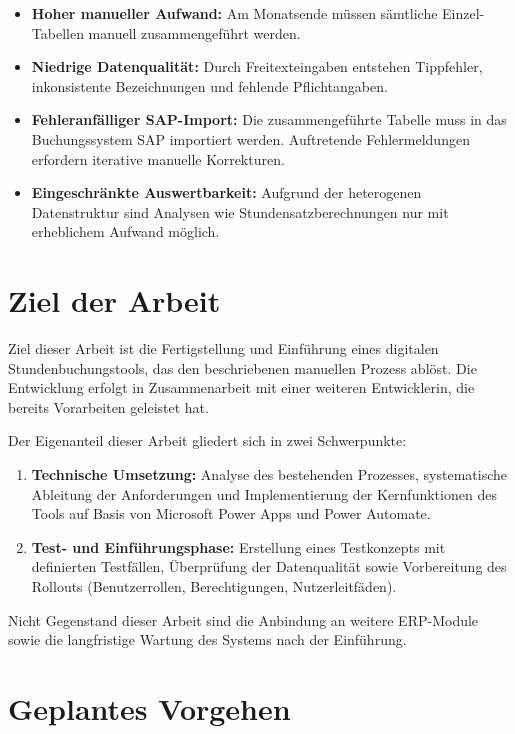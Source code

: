 \begin{itemize}
    \item \textbf{Hoher manueller Aufwand:} Am Monatsende müssen 
    sämtliche Einzel-Tabellen manuell zusammengeführt werden.
    \item \textbf{Niedrige Datenqualität:} Durch Freitexteingaben 
    entstehen Tippfehler, inkonsistente Bezeichnungen und fehlende 
    Pflichtangaben.
    \item \textbf{Fehleranfälliger SAP-Import:} Die zusammengeführte 
    Tabelle muss in das Buchungssystem SAP importiert werden. 
    Auftretende Fehlermeldungen erfordern iterative manuelle 
    Korrekturen.
    \item \textbf{Eingeschränkte Auswertbarkeit:} Aufgrund der 
    heterogenen Datenstruktur sind Analysen wie 
    Stundensatzberechnungen nur mit erheblichem Aufwand möglich.
\end{itemize}

\section{Ziel der Arbeit}
\label{sec:ziel}

Ziel dieser Arbeit ist die Fertigstellung und Einführung eines 
digitalen Stundenbuchungstools, das den beschriebenen manuellen 
Prozess ablöst. Die Entwicklung erfolgt in Zusammenarbeit mit einer 
weiteren Entwicklerin, die bereits Vorarbeiten geleistet hat.

Der Eigenanteil dieser Arbeit gliedert sich in zwei Schwerpunkte:

\begin{enumerate}
    \item \textbf{Technische Umsetzung:} Analyse des bestehenden 
    Prozesses, systematische Ableitung der Anforderungen und 
    Implementierung der Kernfunktionen des Tools auf Basis von 
    Microsoft Power Apps und Power Automate.
    \item \textbf{Test- und Einführungsphase:} Erstellung eines 
    Testkonzepts mit definierten Testfällen, Überprüfung der 
    Datenqualität sowie Vorbereitung des Rollouts (Benutzerrollen, 
    Berechtigungen, Nutzerleitfäden).
\end{enumerate}

Nicht Gegenstand dieser Arbeit sind die Anbindung an weitere 
ERP-Module sowie die langfristige Wartung des Systems nach der 
Einführung.

\section{Geplantes Vorgehen}
\label{sec:vorgehen}

